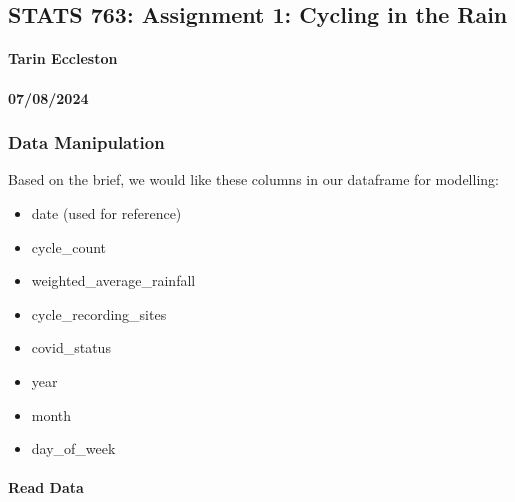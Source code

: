 \documentclass[
]{article}
\author{}
\date{\vspace{-2.5em}}
\providecommand{\tightlist}{%
  \setlength{\itemsep}{0pt}\setlength{\parskip}{0pt}}
\begin{document}
\hypertarget{stats-763-assignment-1-cycling-in-the-rain}{%
\subsection{STATS 763: Assignment 1: Cycling in the
Rain}\label{stats-763-assignment-1-cycling-in-the-rain}}

\hypertarget{tarin-eccleston}{%
\paragraph{Tarin Eccleston}\label{tarin-eccleston}}

\hypertarget{section}{%
\paragraph{07/08/2024}\label{section}}

\hypertarget{data-manipulation}{%
\subsubsection{Data Manipulation}\label{data-manipulation}}

Based on the brief, we would like these columns in our dataframe for
modelling:

\begin{itemize}
\tightlist
\item
  date (used for reference)
\item
  cycle\_count
\item
  weighted\_average\_rainfall
\item
  cycle\_recording\_sites
\item
  covid\_status
\item
  year
\item
  month
\item
  day\_of\_week
\end{itemize}

\hypertarget{read-data}{%
\paragraph{Read Data}\label{read-data}}
\end{document}
